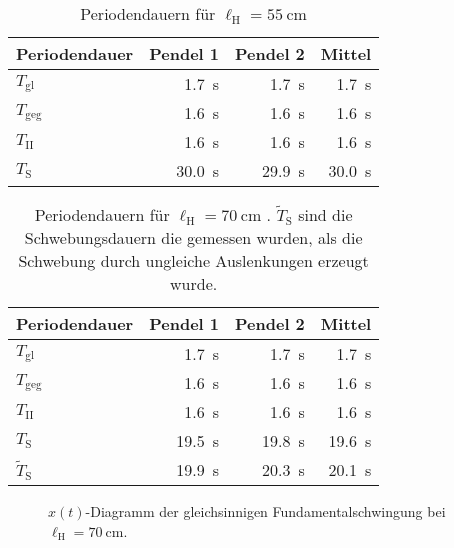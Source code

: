 \documentclass[
12pt,
a4paper,
bibliography=totocnumbered, %
BCOR=1cm, %
oneside, %
]{scrartcl}
\newcommand{\lh}{\ell_{\mathrm{H}}}
\begin{document}
\begin{table}[H]
		\caption{Periodendauern für \(\lh = \qty{55}{\centi\meter}\) \label{tbl:res55}}
	\begin{tabular*}{\textwidth}{@{\extracolsep{\fill}}@{\hspace{5pt}}lrrr@{\hspace{5pt}}}
		\toprule
		Periodendauer & Pendel 1 & Pendel 2 & Mittel\\
		\midrule
		\(T_{\text{gl}}\) & \qty{1,7}{\second} & \qty{1,7}{\second} & \qty{1,7}{\second}\\
		\(T_{\text{geg}}\) & \qty{1,6}{\second} & \qty{1,6}{\second} & \qty{1,6}{\second}\\
		\(T_{\text{II}}\) & \qty{1,6}{\second} & \qty{1,6}{\second} & \qty{1,6}{\second}\\
		\(T_{\text{S}}\) & \qty{30,0}{\second} & \qty{29,9}{\second} & \qty{30,0}{\second} \\
		\bottomrule
	\end{tabular*}
\end{table}

\begin{table}[H]
		\caption{Periodendauern für \(\lh = \qty{70}{\centi\meter}\) \label{tbl:res70}. \(\tilde{T}_{\text{S}}\) sind die Schwebungsdauern die gemessen wurden, als die Schwebung durch ungleiche Auslenkungen erzeugt wurde.}
	\begin{tabular*}{\textwidth}{@{\extracolsep{\fill}}@{\hspace{5pt}}lrrr@{\hspace{5pt}}}
		\toprule
		Periodendauer & Pendel 1 & Pendel 2 & Mittel\\
		\midrule
		\(T_{\text{gl}}\) & \qty{1,7}{\second} & \qty{1,7}{\second} & \qty{1,7}{\second}\\
		\(T_{\text{geg}}\) & \qty{1,6}{\second} & \qty{1,6}{\second} & \qty{1,6}{\second}\\
		\(T_{\text{II}}\) & \qty{1,6}{\second} & \qty{1,6}{\second} & \qty{1,6}{\second}\\
		\(T_{\text{S}}\) & \qty{19,5}{\second} & \qty{19,8}{\second} & \qty{19,6}{\second} \\
		\(\tilde{T}_{\text{S}}\) & \qty{19,9}{\second} & \qty{20,3}{\second} & \qty{20,1}{\second}\\
		\bottomrule
	\end{tabular*}
\end{table}


\begin{figure}[H]
	\caption{\(x(t)\)-Diagramm der gleichsinnigen Fundamentalschwingung bei \(\lh = \qty{70}{\centi\meter}\).}
	\label{fig:gl70}
\end{figure}
\end{document}
